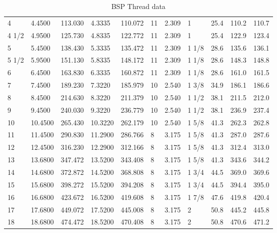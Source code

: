 \begin{table}[h!]
\begin{longtable}{l|ll|ll|ll|ll|ll}
         4&    4.4500&   113.030&    4.3335&   110.072&        11&     2.309&         1&      25.4&     110.2&     110.7\\
     4 1/2&    4.9500&   125.730&    4.8335&   122.772&        11&     2.309&         1&      25.4&     122.9&     123.4\\
         5&    5.4500&   138.430&    5.3335&   135.472&        11&     2.309&     1 1/8&      28.6&     135.6&     136.1\\
     5 1/2&    5.9500&   151.130&    5.8335&   148.172&        11&     2.309&     1 1/8&      28.6&     148.3&     148.8\\
         6&    6.4500&   163.830&    6.3335&   160.872&        11&     2.309&     1 1/8&      28.6&     161.0&     161.5\\
         7&    7.4500&   189.230&    7.3220&   185.979&        10&     2.540&     1 3/8&      34.9&     186.1&     186.6\\
         8&    8.4500&   214.630&    8.3220&   211.379&        10&     2.540&     1 1/2&      38.1&     211.5&     212.0\\
         9&    9.4500&   240.030&    9.3220&   236.779&        10&     2.540&     1 1/2&      38.1&     236.9&     237.4\\
        10&   10.4500&   265.430&   10.3220&   262.179&        10&     2.540&     1 5/8&      41.3&     262.3&     262.8\\
        11&   11.4500&   290.830&   11.2900&   286.766&         8&     3.175&     1 5/8&      41.3&     287.0&     287.6\\
        12&   12.4500&   316.230&   12.2900&   312.166&         8&     3.175&     1 5/8&      41.3&     312.4&     313.0\\
        13&   13.6800&   347.472&   13.5200&   343.408&         8&     3.175&     1 5/8&      41.3&     343.6&     344.2\\
        14&   14.6800&   372.872&   14.5200&   368.808&         8&     3.175&     1 3/4&      44.5&     369.0&     369.6\\
        15&   15.6800&   398.272&   15.5200&   394.208&         8&     3.175&     1 3/4&      44.5&     394.4&     395.0\\
        16&   16.6800&   423.672&   16.5200&   419.608&         8&     3.175&     1 7/8&      47.6&     419.8&     420.4\\
        17&   17.6800&   449.072&   17.5200&   445.008&         8&     3.175&         2&      50.8&     445.2&     445.8\\
        18&   18.6800&   474.472&   18.5200&   470.408&         8&     3.175&         2&      50.8&     470.6&     471.2\\
\end{longtable}
\caption{BSP Thread data}
\end{table}
\clearpage
